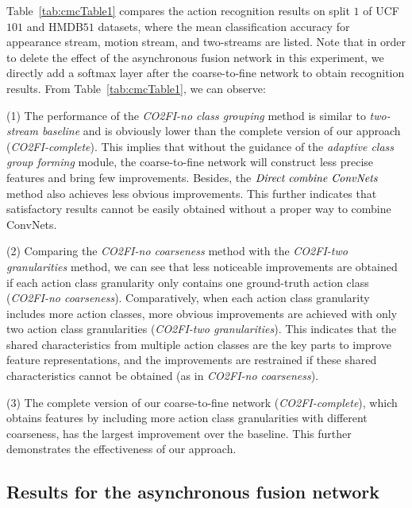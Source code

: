 \documentclass[letterpaper]{article}
\begin{document}
{Table~\ref{tab:cmcTable1} compares the action recognition results on split $1$ of UCF$101$ and HMDB$51$ datasets, where the mean classification accuracy for appearance stream, motion stream, and two-streams are listed. Note that in order to delete the effect of the asynchronous fusion network in this experiment, we directly add a softmax layer after the coarse-to-fine network to obtain recognition results. From Table~\ref{tab:cmcTable1}, we can observe:

(1) The performance of the \emph{CO2FI-no class grouping} method is similar to \emph{two-stream baseline} and is obviously lower than the complete version of our approach (\emph{CO2FI-complete}). This implies that without the guidance of the \emph{adaptive class group forming} module, the coarse-to-fine network will construct less precise features and bring few improvements. Besides, the $\emph{Direct combine ConvNets}$ method also achieves less obvious improvements. This further indicates that satisfactory results cannot be easily obtained without a proper way to combine ConvNets.

(2) Comparing the \emph{CO2FI-no coarseness} method with the \emph{CO2FI-two granularities} method, we can see that less noticeable improvements are obtained if each action class granularity only contains one ground-truth action class (\emph{CO2FI-no coarseness}). Comparatively, when each action class granularity includes more action classes, more obvious improvements are achieved with only two action class granularities (\emph{CO2FI-two granularities}). This indicates that the shared characteristics from multiple action classes are the key parts to improve feature representations, and the improvements are restrained if these shared characteristics cannot be obtained (as in \emph{CO2FI-no coarseness}).

(3) The complete version of our coarse-to-fine network (\emph{CO2FI-complete}), which obtains features by including more action class granularities with different coarseness, has the largest improvement over the baseline. This further demonstrates the effectiveness of our approach.







\subsection{Results for the asynchronous fusion network}

}
\end{document}
